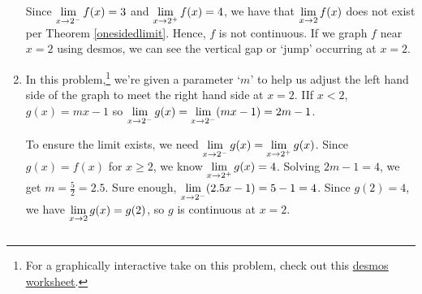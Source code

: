 \begin{ex}
\begin{enumerate}
\medskip

Since $\displaystyle{\lim_{x \rightarrow 2^{-}} f(x) = 3}$ and $\displaystyle{\lim_{x \rightarrow 2^{+}} f(x) = 4}$, we have that $\displaystyle{\lim_{x \rightarrow 2} f(x)}$ does not exist per Theorem \ref{onesidedlimit}.  Hence, $f$ is not continuous.  If we graph $f$ near $x=2$ using desmos, we can see the vertical gap or `jump' occurring at $x = 2$.  

\medskip

\item In this problem,\footnote{For a graphically interactive take on this problem, check out this \href{https://www.desmos.com/calculator/ibtrzesg4i}{\underline{desmos worksheet}}.}  we're given a parameter `$m$' to help us adjust the left hand side of the graph to meet the right hand side at $x = 2$.  IIf $x<2$, $g(x) = mx-1$ so $\displaystyle{\lim_{x \rightarrow 2^{-}} g(x) = \lim_{x \rightarrow 2^{-}} (mx-1) = 2m-1}$. 

\medskip

To ensure the limit exists, we need  $\displaystyle{\lim_{x \rightarrow 2^{-}} g(x) = \lim_{x \rightarrow 2^{+}} g(x)}$.  Since $g(x) = f(x)$ for $x \geq 2$, we know $\displaystyle{ \lim_{x \rightarrow 2^{+}} g(x) = 4}$.  Solving  $2m-1 = 4$, we get $m = \frac{5}{2} = 2.5$.  Sure enough, $\displaystyle{\lim_{x \rightarrow 2^{-}} (2.5x-1) = 5 - 1 = 4}$.  Since $g(2) = 4$, we have $\displaystyle{\lim_{x \rightarrow 2} g(x) = g(2)}$, so $g$ is continuous at $x = 2$. 

\begin{center}

\begin{tabular}{cc}


\end{tabular}
\end{center}
\end{enumerate}
\end{ex}
